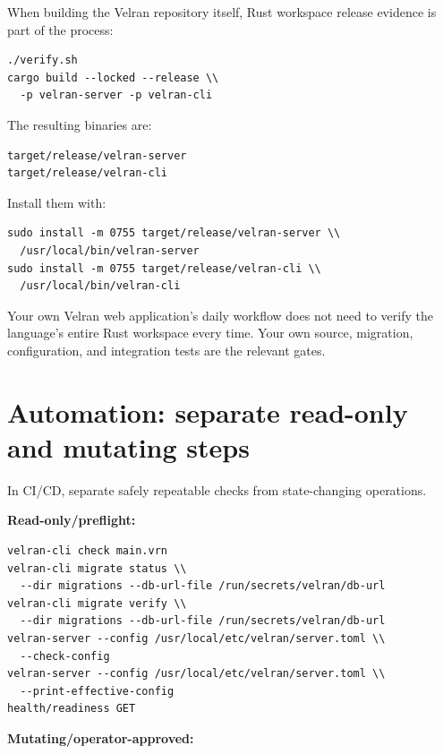 When building the Velran repository itself, Rust workspace release evidence is part of the process:

\begin{lstlisting}
./verify.sh
cargo build --locked --release \\
  -p velran-server -p velran-cli
\end{lstlisting}

The resulting binaries are:

\begin{lstlisting}
target/release/velran-server
target/release/velran-cli
\end{lstlisting}

Install them with:

\begin{lstlisting}
sudo install -m 0755 target/release/velran-server \\
  /usr/local/bin/velran-server
sudo install -m 0755 target/release/velran-cli \\
  /usr/local/bin/velran-cli
\end{lstlisting}

Your own Velran web application's daily workflow does not need to verify the language's entire Rust workspace every time. Your own source, migration, configuration, and integration tests are the relevant gates.

\section{Automation: separate read-only and mutating steps}

In CI/CD, separate safely repeatable checks from state-changing operations.

\textbf{Read-only/preflight:}

\begin{lstlisting}
velran-cli check main.vrn
velran-cli migrate status \\
  --dir migrations --db-url-file /run/secrets/velran/db-url
velran-cli migrate verify \\
  --dir migrations --db-url-file /run/secrets/velran/db-url
velran-server --config /usr/local/etc/velran/server.toml \\
  --check-config
velran-server --config /usr/local/etc/velran/server.toml \\
  --print-effective-config
health/readiness GET
\end{lstlisting}

\textbf{Mutating/operator-approved:}

